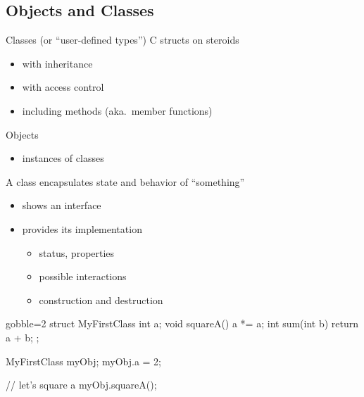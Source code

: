 \subsection[OO]{Objects and Classes}

\begin{frame}[fragile]
  \begin{block}{Classes (or ``user-defined types'')}
    C structs on steroids
    \begin{itemize}
    \item with inheritance
    \item with access control
    \item including methods (aka.\ member functions)
    \end{itemize}
  \end{block}
  \begin{block}{Objects}
    \begin{itemize}
    \item instances of classes
    \end{itemize}
  \end{block}
  \begin{block}{A class encapsulates state and behavior of ``something''}
    \begin{itemize}
    \item shows an interface
    \item provides its implementation
      \begin{itemize}
      \item status, properties
      \item possible interactions
      \item construction and destruction
      \end{itemize}
    \end{itemize}
  \end{block}
\end{frame}


\begin{frame}[fragile]
  \begin{multicols}{2}
    \begin{cppcode*}{gobble=2}
      struct MyFirstClass {
        int a;
        void squareA() {
          a *= a;
        }
        int sum(int b) {
          return a + b;
        }
      };

      MyFirstClass myObj;
      myObj.a = 2;

      // let's square a
      myObj.squareA();
    \end{cppcode*}
    \columnbreak
    \center
    \null \vfill
    \vfill \null
  \end{multicols}
\end{frame}

